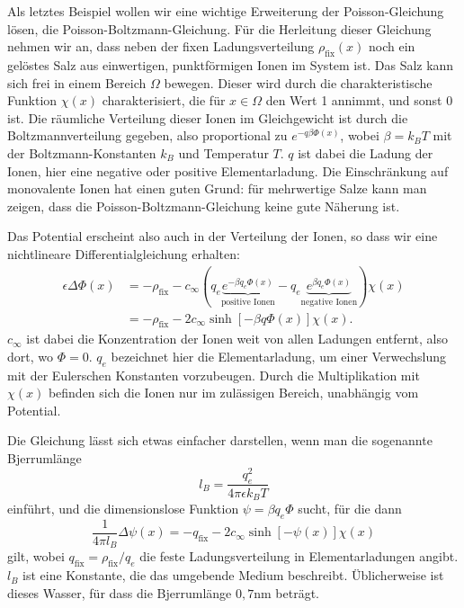 Als letztes Beispiel wollen wir eine wichtige Erweiterung der
Poisson-Gleichung lösen, die Poisson-Boltzmann-Gleichung. Für die
Herleitung dieser Gleichung nehmen wir an, dass neben der fixen
Ladungsverteilung $\rho_\text{fix}(x)$ noch ein gelöstes Salz aus
einwertigen, punktförmigen Ionen im System ist. Das Salz kann sich
frei in einem Bereich $\Omega$ bewegen. Dieser wird durch die
charakteristische Funktion $\chi(x)$ charakterisiert, die für
$x\in\Omega$ den Wert 1 annimmt, und sonst 0 ist. Die räumliche
Verteilung dieser Ionen im Gleichgewicht ist durch die
Boltzmannverteilung gegeben, also proportional zu
$e^{-q\beta\Phi(x)}$, wobei $\beta=k_BT$ mit der Boltzmann-Konstanten
$k_B$ und Temperatur $T$. $q$ ist dabei die Ladung der Ionen, hier
eine negative oder positive Elementarladung. Die Einschränkung auf
monovalente Ionen hat einen guten Grund: für mehrwertige Salze kann
man zeigen, dass die Poisson-Boltzmann-Gleichung keine gute Näherung
ist.

Das Potential erscheint also auch in der Verteilung der Ionen, so dass
wir eine nichtlineare Differentialgleichung erhalten:
\begin{align}
  \epsilon\Delta \Phi(x)  &=
  -\rho_\text{fix} - c_\infty \left(q_e\underbrace{e^{-\beta
        q_e\Phi(x)}}_\text{positive Ionen} -q_e\underbrace{e^{\beta
        q_e\Phi(x)}}_\text{negative Ionen}\right)\chi(x)\nonumber\\
  &=
  -\rho_\text{fix} - 2c_\infty\sinh[-\beta q\Phi(x)]\chi(x).
\end{align}
$c_\infty$ ist dabei die Konzentration der Ionen weit von allen
Ladungen entfernt, also dort, wo $\Phi=0$. $q_e$ bezeichnet hier die
Elementarladung, um einer Verwechslung mit der Eulerschen Konstanten
vorzubeugen. Durch die Multiplikation mit $\chi(x)$ befinden sich die
Ionen nur im zulässigen Bereich, unabhängig vom Potential.

Die Gleichung lässt sich etwas einfacher darstellen, wenn man die
sogenannte Bjerrumlänge
\begin{equation}
  l_B = \frac{q_e^2}{4\pi\epsilon k_BT}
\end{equation}
einführt, und die dimensionslose Funktion $\psi=\beta q_e\Phi$ sucht,
für die dann
\begin{equation}
  \label{eq:pb}
  \frac{1}{4\pi l_B}\Delta \psi(x) =
  -q_\text{fix} - 2c_\infty\sinh[-\psi(x)]\chi(x)
\end{equation}
gilt, wobei $q_\text{fix} = \rho_\text{fix}/q_e$ die feste
Ladungsverteilung in Elementarladungen angibt. $l_B$ ist eine Konstante,
die das umgebende Medium beschreibt. Üblicherweise ist dieses Wasser,
für dass die Bjerrumlänge $0,7$nm beträgt.

